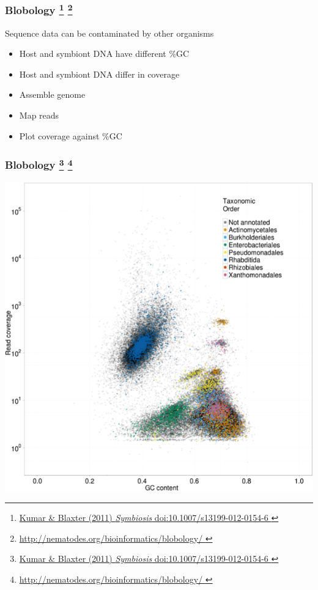 %
\begin{frame}
  \frametitle{Blobology
  \footnote{\tiny{\href{http://dx.doi.org/10.1007/s13199-012-0154-6
}{Kumar \& Blaxter (2011) \textit{Symbiosis} doi:10.1007/s13199-012-0154-6
}}}
  \footnote{\tiny{\href{http://nematodes.org/bioinformatics/blobology/
}{http://nematodes.org/bioinformatics/blobology/
}}}  
  }
  Sequence data can be contaminated by other organisms
  \begin{itemize}
    \item \textcolor{hutton_green}{Host and symbiont DNA have different \%GC}
    \item \textcolor{hutton_green}{Host and symbiont DNA differ in coverage}
  \end{itemize}
      \begin{itemize}
        \item \textcolor{RawSienna}{Assemble genome}
        \item \textcolor{hutton_blue}{Map reads}
        \item \textcolor{hutton_purple}{Plot coverage against \%GC}
      \end{itemize}
\end{frame}

%
\begin{frame}
  \frametitle{Blobology
  \footnote{\tiny{\href{http://dx.doi.org/10.1007/s13199-012-0154-6
}{Kumar \& Blaxter (2011) \textit{Symbiosis} doi:10.1007/s13199-012-0154-6
}}}
  \footnote{\tiny{\href{http://nematodes.org/bioinformatics/blobology/
}{http://nematodes.org/bioinformatics/blobology/
}}}  
  }
  \begin{center}
    \includegraphics[height=0.7\textheight]{images/blobology}
  \end{center}
\end{frame}

